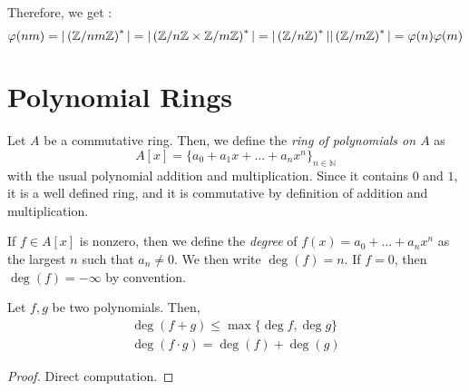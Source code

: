 Therefore, we get : 
\[
  \varphi(nm) = |\left(\mathbb{Z}/nm\mathbb{Z}\right)^*| = |\left(\mathbb{Z}/n\mathbb{Z} \times \mathbb{Z}/m\mathbb{Z}\right)^*| = |\left(\mathbb{Z}/n\mathbb{Z}\right)^*| |\left(\mathbb{Z}/m\mathbb{Z}\right)^*| = \varphi(n)\varphi(m)
\]

\section{Polynomial Rings}

\begin{definition}
  Let $A$ be a commutative ring. Then, we define the \emph{ring of polynomials on $A$} as 
  \[
    A[x] = \{a_0 + a_1x + ... + a_nx^n\}_{n \in \mathbb{N}}
  \]
  with the usual polynomial addition and multiplication. Since it contains $0$ and $1$, it is a well defined ring, and it is commutative by definition of addition and multiplication. 
\end{definition}
\begin{definition}
  If $f \in A[x]$ is nonzero, then we define the \emph{degree} of $f(x) = a_0 + ... + a_nx^n$ as the largest $n$ such that $a_n \neq 0$. We then write $\deg(f) = n$. If $f = 0$, then $\deg(f) = -\infty$ by convention\footnotemark.
\end{definition}

\begin{theorem*}
  Let $f, g$ be two polynomials. Then, 
  \begin{gather*}
    \deg (f + g) \leqslant \max\{\deg f, \deg g\} \\
    \deg (f \cdot g) = \deg(f) + \deg(g)
  \end{gather*}
\end{theorem*}
\begin{proof}
  Direct computation. 
\end{proof}

